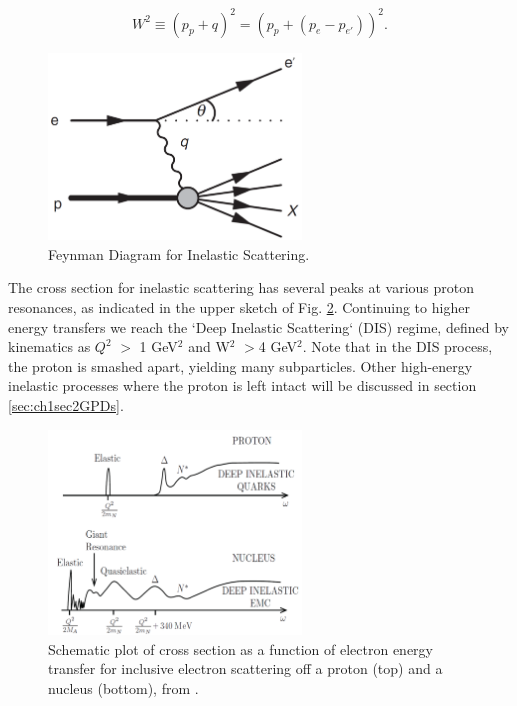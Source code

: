         \begin{equation}\label{eq:W}
            W^2 \equiv (p_p + q)^2 = (p_p + (p_e-p_{e'}))^2.
        \end{equation}
          

    
        \begin{figure}[ht]
            \centering
            \includegraphics[width=0.6\textwidth]{Chapters/Ch1-Intro/Ch1-Sec1-Background/pics/inelastic-ep/eppx.png}
            \caption{Feynman Diagram for Inelastic Scattering.}
            \label{fig:FeynmanInelastic}
        \end{figure}

        The cross section for inelastic scattering has several peaks at various proton resonances, as indicated in the upper sketch of Fig. \ref{fig:ScatteringvsW}. Continuing to higher energy transfers we reach the `Deep Inelastic Scattering` (DIS) regime, defined by kinematics as $Q^2$ $>$ 1 GeV$^2$ and W$^2$ $>$4 GeV$^2$. Note that in the DIS process, the proton is smashed apart, yielding many subparticles. Other high-energy inelastic processes where the proton is left intact will be discussed in section \ref{sec:ch1sec2GPDs}. 

        \begin{figure}[ht]
            \centering
            \includegraphics[width=0.6\textwidth]{Chapters/Ch1-Intro/Ch1-Sec1-Background/pics/intro/scatcrosstheory.png}
            \caption[Scattering Cross Section vs. Energy Transfer]{Schematic plot of cross section as a function of electron energy transfer for inclusive electron scattering off a proton (top) and a nucleus (bottom), from \parencite{Donnelly2017FoundationsPhysics}. }
            \label{fig:ScatteringvsW}
        \end{figure}


